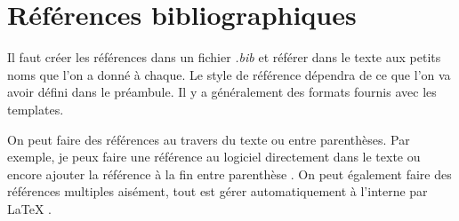 \documentclass[Master.tex]{subfiles}
\begin{document}
\section{Références bibliographiques}

Il faut créer les références dans un fichier \emph{.bib} et référer dans le texte aux petits noms que l'on a donné à chaque. Le style de référence dépendra de ce que l'on va avoir défini dans le préambule. Il y a généralement des formats fournis avec les templates.

On peut faire des références au travers du texte ou entre parenthèses. Par exemple, je peux faire une référence au logiciel \cite{WHAT2016} directement dans le texte ou encore ajouter la référence à la fin entre parenthèse \citep{WHAT2016}. On peut également faire des références multiples aisément, tout est gérer automatiquement à l'interne par \LaTeX{} \citep{WHAT2016,ladeveze2016}.
\end{document}
